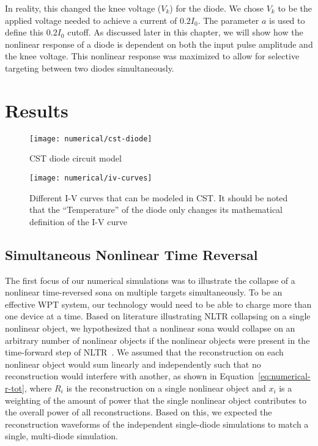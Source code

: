 In reality, this changed the knee voltage ($V_{k}$) for the diode. We chose $V_{k}$ to be the applied voltage needed to achieve a current of $0.2 I_{0}$. The parameter $a$ is used to define this $0.2 I_{0}$ cutoff. As discussed later in this chapter, we will show how the nonlinear response of a diode is dependent on both the input pulse amplitude and the knee voltage. This nonlinear response was maximized to allow for selective targeting between two diodes simultaneously.
\section{Results}
\label{sec:numerical-results}

\begin{figure}[]
\centering
\texttt{[image: numerical/cst-diode]}
\caption[CST diode circuit model]{CST diode circuit model}
\label{fig:numerical-cst-diode}

\vspace*{\floatsep}%

\texttt{[image: numerical/iv-curves]}
\caption[I-V curves of diodes with different voltage knees]{Different I-V curves that can be modeled in CST. It should be noted that the ``Temperature'' of the diode only changes its mathematical definition of the I-V curve}
\label{fig:numerical-iv-curves}
\end{figure}

\subsection{Simultaneous Nonlinear Time Reversal}

The first focus of our numerical simulations was to illustrate the collapse of a nonlinear time-reversed sona on multiple targets simultaneously. To be an effective WPT system, our technology would need to be able to charge more than one device at a time. Based on literature illustrating NLTR collapsing on a single nonlinear object, we hypothesized that a nonlinear sona would collapse on an arbitrary number of nonlinear objects if the nonlinear objects were present in the time-forward step of NLTR~\cite{nltr-classical-waves,nltr-wave-chaotic}. We assumed that the reconstruction on each nonlinear object would sum linearly and independently such that no reconstruction would interfere with another, as shown in Equation~\ref{eq:numerical-r-tot}, where $R_{i}$ is the reconstruction on a single nonlinear object and $x_{i}$ is a weighting of the amount of power that the single nonlinear object contributes to the overall power of all reconstructions. Based on this, we expected the reconstruction waveforms of the independent single-diode simulations to match a single, multi-diode simulation.


